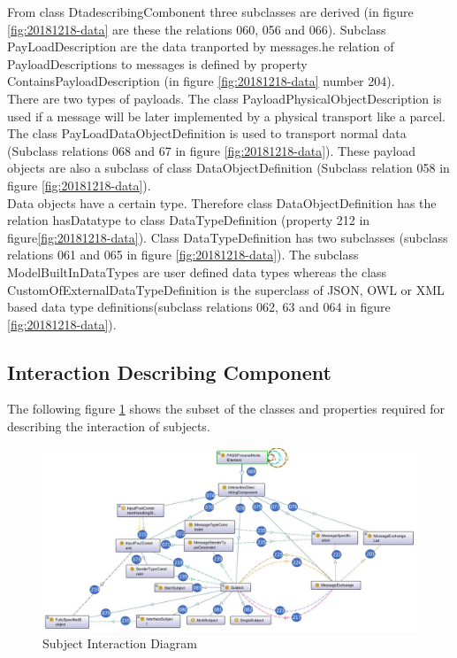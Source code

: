 From class DtadescribingCombonent three subclasses are derived (in figure \ref{fig:20181218-data} are these the relations 060, 056 and 066). Subclass PayLoadDescription are the data tranported by messages.he relation of PayloadDescriptions to messages is defined by property ContainsPayloadDescription (in figure \ref{fig:20181218-data} number 204). \\
There are two types of payloads. The class PayloadPhysicalObjectDescription is used if a message will be later implemented by a physical transport like a parcel. The class PayLoadDataObjectDefinition is used to transport normal data (Subclass relations 068 and 67 in figure \ref{fig:20181218-data}). These payload objects are also a subclass of class DataObjectDefinition (Subclass relation 058 in figure \ref{fig:20181218-data}). \\
Data objects have a certain type. Therefore class DataObjectDefinition has the relation hasDatatype to class DataTypeDefinition (property 212 in figure\ref{fig:20181218-data}). Class DataTypeDefinition has two subclasses (subclass relations 061 and 065 in figure \ref{fig:20181218-data}). The subclass ModelBuiltInDataTypes are user defined data types whereas the class CustomOfExternalDataTypeDefinition is the superclass of JSON, OWL or XML based data type definitions(subclass relations 062, 63 and 064 in figure \ref{fig:20181218-data}).

\newpage

\subsection{Interaction Describing Component}

The following figure \ref{fig:ontogrsubjectinteraction} shows the subset of the classes and properties required for describing the interaction of subjects. 

\begin{figure}[ph]
	\centering
	\includegraphics[width=1.0\linewidth]{20181026-Ontologie-Bilder/Grafiken-Ontologie/SUbject-Interaction/OntoGrSubjectInteraction}
	\caption[Subject Interaction Diagram]{Subject Interaction Diagram}
	\label{fig:ontogrsubjectinteraction}
\end{figure}


